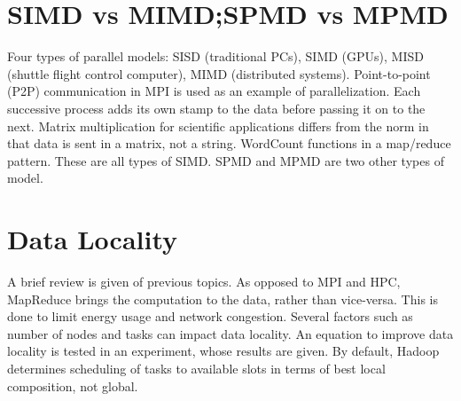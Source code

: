 


\section{SIMD vs MIMD;SPMD vs MPMD}

Four types of parallel models: SISD (traditional PCs), SIMD (GPUs), MISD
(shuttle flight control computer), MIMD (distributed systems).
Point-to-point (P2P) communication in MPI is used as an example of
parallelization. Each successive process adds its own stamp to the data
before passing it on to the next. Matrix multiplication for scientific
applications differs from the norm in that data is sent in a matrix, not
a string. WordCount functions in a map/reduce pattern. These are all
types of SIMD. SPMD and MPMD are two other types of model.




\section{Data Locality}

A brief review is given of previous topics. As opposed to MPI and HPC,
MapReduce brings the computation to the data, rather than vice-versa.
This is done to limit energy usage and network congestion. Several
factors such as number of nodes and tasks can impact data locality. An
equation to improve data locality is tested in an experiment, whose
results are given. By default, Hadoop determines scheduling of tasks to
available slots in terms of best local composition, not global.



